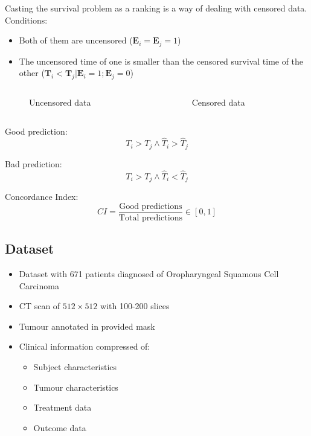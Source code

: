 \begin{frame}

  Casting the survival problem as a ranking is a way of dealing with censored data.
  Conditions:
  \begin{itemize}
    \item Both of them are uncensored (\( \bm{E}_i = \bm{E}_j = 1\))
    \item The uncensored time of one is smaller than the censored survival time of the other
    (\( \bm{T}_i < \bm{T}_j | \bm{E}_i = 1; \bm{E}_j = 0 \))
  \end{itemize}

  \begin{columns}
    \begin{column}{.5\textwidth}
      \begin{figure}
        \centering
        \scalebox{.8}{}
        \caption{Uncensored data}
      \end{figure}
    \end{column}
    \begin{column}{.5\textwidth}
      \begin{figure}
        \centering
        \scalebox{.8}{}
        \caption{Censored data}
      \end{figure}
    \end{column}
  \end{columns}
\end{frame}

\begin{frame}
  Good prediction:
  \[
    T_i > T_j \land \hat{T}_i > \hat{T}_j
  \]

  Bad prediction:
  \[
    T_i > T_j \land \hat{T}_i < \hat{T}_j
  \]

  Concordance Index:
  \[
    CI = \frac{\text{Good predictions}}{\text{Total predictions}} \in [0, 1]
  \]
\end{frame}

\subsection{Dataset}
\begin{frame}{\insertsubsec}
  \begin{itemize}
    \item Dataset with 671 patients diagnosed of Oropharyngeal Squamous Cell Carcinoma
    \item CT scan of \( 512 \times 512 \) with 100-200 slices
    \item Tumour annotated in provided mask
    \item Clinical information compressed of:
    \begin{itemize}
      \item Subject characteristics
      \item Tumour characteristics
      \item Treatment data
      \item Outcome data
    \end{itemize}
  \end{itemize}
\end{frame}

